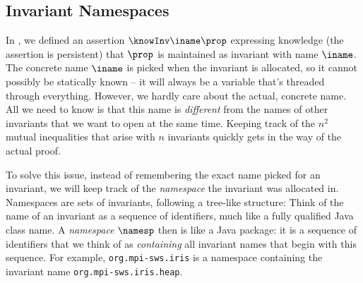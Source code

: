 
\subsection{Invariant Namespaces}
\label{sec:namespaces}

In , we defined an assertion $\knowInv\iname\prop$ expressing knowledge (\ie the assertion is persistent) that $\prop$ is maintained as invariant with name $\iname$.
The concrete name $\iname$ is picked when the invariant is allocated, so it cannot possibly be statically known -- it will always be a variable that's threaded through everything.
However, we hardly care about the actual, concrete name.
All we need to know is that this name is \emph{different} from the names of other invariants that we want to open at the same time.
Keeping track of the $n^2$ mutual inequalities that arise with $n$ invariants quickly gets in the way of the actual proof.

To solve this issue, instead of remembering the exact name picked for an invariant, we will keep track of the \emph{namespace} the invariant was allocated in.
Namespaces are sets of invariants, following a tree-like structure:
Think of the name of an invariant as a sequence of identifiers, much like a fully qualified Java class name.
A \emph{namespace} $\namesp$ then is like a Java package: it is a sequence of identifiers that we think of as \emph{containing} all invariant names that begin with this sequence. For example, \texttt{org.mpi-sws.iris} is a namespace containing the invariant name \texttt{org.mpi-sws.iris.heap}.

